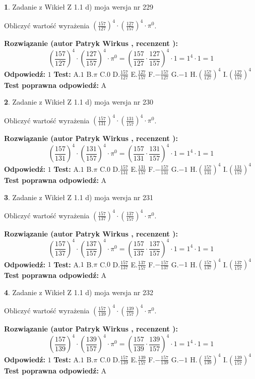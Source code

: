 \documentclass[12pt, a4paper]{article}
\theoremstyle{definition} %
\newtheorem{zad}{}
\newcommand{\zadStart}[1]{\begin{zad}#1\newline}
\newcommand{\zadStop}{\end{zad}}
\newcommand{\rozwStart}[2]{\noindent \textbf{Rozwiązanie (autor #1 , recenzent #2): }\newline}
\newcommand{\rozwStop}{\newline}
\newcommand{\odpStart}{\noindent \textbf{Odpowiedź:}\newline}
\newcommand{\odpStop}{\newline}
\newcommand{\testStart}{\noindent \textbf{Test:}\newline}
\newcommand{\testStop}{\newline}
\newcommand{\kluczStart}{\noindent \textbf{Test poprawna odpowiedź:}\newline}
\newcommand{\kluczStop}{\newline}
\begin{document}
\zadStart{Zadanie z Wikieł Z 1.1 d) moja wersja nr 229}

Obliczyć wartość wyrażenia $(\frac{157}{127})^{4} \cdot (\frac{127}{157})^{4} \cdot \pi^{0}$.
\zadStop
\rozwStart{Patryk Wirkus}{}
$$(\frac{157}{127})^{4} \cdot (\frac{127}{157})^{4} \cdot \pi^{0} = (\frac{157}{127} \cdot \frac{127}{157})^{4} \cdot 1 = 1^{4} \cdot 1 = 1$$
\rozwStop
\odpStart
$1$
\odpStop
\testStart
A.$1$ B.$\pi$ C.$0$ D.$\frac{157}{127}$ E.$\frac{127}{157}$
F.$-\frac{157}{127}$ G.$-1$
H.$(\frac{157}{127})^{4}$
I.$(\frac{127}{157})^{4}$
\testStop
\kluczStart
A
\kluczStop



\zadStart{Zadanie z Wikieł Z 1.1 d) moja wersja nr 230}

Obliczyć wartość wyrażenia $(\frac{157}{131})^{4} \cdot (\frac{131}{157})^{4} \cdot \pi^{0}$.
\zadStop
\rozwStart{Patryk Wirkus}{}
$$(\frac{157}{131})^{4} \cdot (\frac{131}{157})^{4} \cdot \pi^{0} = (\frac{157}{131} \cdot \frac{131}{157})^{4} \cdot 1 = 1^{4} \cdot 1 = 1$$
\rozwStop
\odpStart
$1$
\odpStop
\testStart
A.$1$ B.$\pi$ C.$0$ D.$\frac{157}{131}$ E.$\frac{131}{157}$
F.$-\frac{157}{131}$ G.$-1$
H.$(\frac{157}{131})^{4}$
I.$(\frac{131}{157})^{4}$
\testStop
\kluczStart
A
\kluczStop



\zadStart{Zadanie z Wikieł Z 1.1 d) moja wersja nr 231}

Obliczyć wartość wyrażenia $(\frac{157}{137})^{4} \cdot (\frac{137}{157})^{4} \cdot \pi^{0}$.
\zadStop
\rozwStart{Patryk Wirkus}{}
$$(\frac{157}{137})^{4} \cdot (\frac{137}{157})^{4} \cdot \pi^{0} = (\frac{157}{137} \cdot \frac{137}{157})^{4} \cdot 1 = 1^{4} \cdot 1 = 1$$
\rozwStop
\odpStart
$1$
\odpStop
\testStart
A.$1$ B.$\pi$ C.$0$ D.$\frac{157}{137}$ E.$\frac{137}{157}$
F.$-\frac{157}{137}$ G.$-1$
H.$(\frac{157}{137})^{4}$
I.$(\frac{137}{157})^{4}$
\testStop
\kluczStart
A
\kluczStop



\zadStart{Zadanie z Wikieł Z 1.1 d) moja wersja nr 232}

Obliczyć wartość wyrażenia $(\frac{157}{139})^{4} \cdot (\frac{139}{157})^{4} \cdot \pi^{0}$.
\zadStop
\rozwStart{Patryk Wirkus}{}
$$(\frac{157}{139})^{4} \cdot (\frac{139}{157})^{4} \cdot \pi^{0} = (\frac{157}{139} \cdot \frac{139}{157})^{4} \cdot 1 = 1^{4} \cdot 1 = 1$$
\rozwStop
\odpStart
$1$
\odpStop
\testStart
A.$1$ B.$\pi$ C.$0$ D.$\frac{157}{139}$ E.$\frac{139}{157}$
F.$-\frac{157}{139}$ G.$-1$
H.$(\frac{157}{139})^{4}$
I.$(\frac{139}{157})^{4}$
\testStop
\kluczStart
A
\kluczStop
\end{document}
